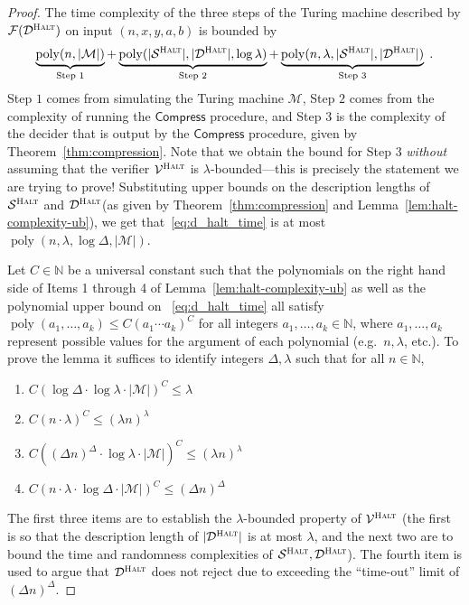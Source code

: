 \documentclass[11pt]{article}
\theoremstyle{definition}
\newcommand{\N}{\ensuremath{\mathbb{N}}}
\DeclareMathOperator{\poly}{poly}
\newcommand{\sampler}{\mathcal{S}}
\newcommand{\decider}{\mathcal{D}}
\newcommand{\verifier}{\mathcal{V}}
\newcommand{\halt}{\textsc{Halt}}
\renewcommand{\cal}[1]{\mathcal{#1}}
\newcommand{\tmstyle}[1]{\ensuremath{\mathsf{#1}}}
\newcommand{\Compress}{\tmstyle{Compress}}
\begin{document}
\begin{proof}
  The time complexity of the three steps of the Turing machine described by
  $\cal{F}(\decider^\halt)$ on input $(n,x,y,a,b)$ is bounded by
  \begin{equation}
    \label{eq:d_halt_time}
    \underbrace{\poly(n,|\cal{M}|)}_{\text{Step $1$}} +
    \underbrace{\poly(|\sampler^\halt|,|\decider^\halt|,
      \log \lambda )}_{\text{Step $2$}} +
    \underbrace{\poly(n,\lambda , |\sampler^\halt|,
      |\decider^\halt|)}_{\text{Step $3$}}\;.
  \end{equation}
  Step $1$ comes from simulating the Turing machine $\cal{M}$, Step $2$ comes
  from the complexity of running the $\Compress$ procedure, and Step $3$ is the
  complexity of the decider that is output by the $\Compress$ procedure, given
  by Theorem~\ref{thm:compression}.
  Note that we obtain the bound for Step $3$ \emph{without} assuming that the
  verifier $\verifier^\halt$ is $\lambda$-bounded---this is precisely the
  statement we are trying to prove!
  Substituting upper bounds on the description lengths of $\sampler^\halt$ and
  $\decider^\halt$(as given by Theorem~\ref{thm:compression} and
  Lemma~\ref{lem:halt-complexity-ub}), we get that~\eqref{eq:d_halt_time} is at
  most $\poly(n,\lambda,\log \Delta,|\cal{M}|)$.

  Let $C \in \N$ be a universal constant such that the polynomials on the right
  hand side of Items 1 through 4 of Lemma~\ref{lem:halt-complexity-ub} as well
  as the polynomial upper bound on ~\eqref{eq:d_halt_time} all satisfy
  $\poly(a_1,\ldots,a_k) \leq C (a_1 \cdots a_k)^C$ for all integers
  $a_1,\ldots,a_k \in \N$, where $a_1,\ldots,a_k$ represent possible values for
  the argument of each polynomial (e.g.\ $n,\lambda$, etc.).
  To prove the lemma it suffices to identify integers $\Delta, \lambda$
  such that for all $n\in \N$,
  \begin{enumerate}
	\item $C (\log \Delta \cdot \log \lambda \cdot |\cal{M}|)^C \leq \lambda$
	\item $C (n \cdot \lambda)^C \leq (\lambda n)^\lambda$ 
	\item $C ( (\Delta n)^\Delta \cdot \log \lambda \cdot |\cal{M}|)^C
    \leq (\lambda n)^\lambda$
	\item $C (n \cdot \lambda \cdot \log \Delta \cdot |\cal{M}|)^C
    \leq (\Delta n)^\Delta$
\end{enumerate}
The first three items are to establish the $\lambda$-bounded property of
$\verifier^\halt$ (the first is so that the description length of
$|\decider^\halt|$ is at most $\lambda$, and the next two are to bound the time
and randomness complexities of $\sampler^\halt,\decider^\halt$).
The fourth item is used to argue that $\decider^\halt$ does not reject due to
exceeding the ``time-out'' limit of $(\Delta n)^\Delta$.


\end{proof}
\end{document}
